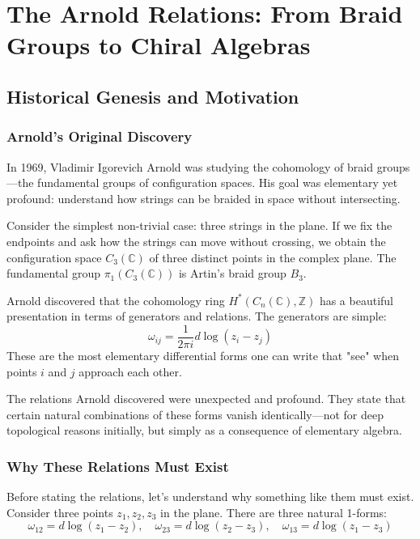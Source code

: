 \appendix
\chapter{The Arnold Relations: From Braid Groups to Chiral Algebras}

\section{Historical Genesis and Motivation}

\subsection{Arnold's Original Discovery}

In 1969, Vladimir Igorevich Arnold was studying the cohomology of braid groups—the fundamental groups of configuration spaces. His goal was elementary yet profound: understand how strings can be braided in space without intersecting.

Consider the simplest non-trivial case: three strings in the plane. If we fix the endpoints and ask how the strings can move without crossing, we obtain the configuration space $C_3(\mathbb{C})$ of three distinct points in the complex plane. The fundamental group $\pi_1(C_3(\mathbb{C}))$ is Artin's braid group $B_3$.

Arnold discovered that the cohomology ring $H^*(C_n(\mathbb{C}), \mathbb{Z})$ has a beautiful presentation in terms of generators and relations. The generators are simple:
$$\omega_{ij} = \frac{1}{2\pi i} d\log(z_i - z_j)$$
These are the most elementary differential forms one can write that "see" when points $i$ and $j$ approach each other.

The relations Arnold discovered were unexpected and profound. They state that certain natural combinations of these forms vanish identically—not for deep topological reasons initially, but simply as a consequence of elementary algebra.

\subsection{Why These Relations Must Exist}

Before stating the relations, let's understand why something like them must exist. Consider three points $z_1, z_2, z_3$ in the plane. There are three natural 1-forms:
$$\omega_{12} = d\log(z_1 - z_2), \quad \omega_{23} = d\log(z_2 - z_3), \quad \omega_{13} = d\log(z_1 - z_3)$$

